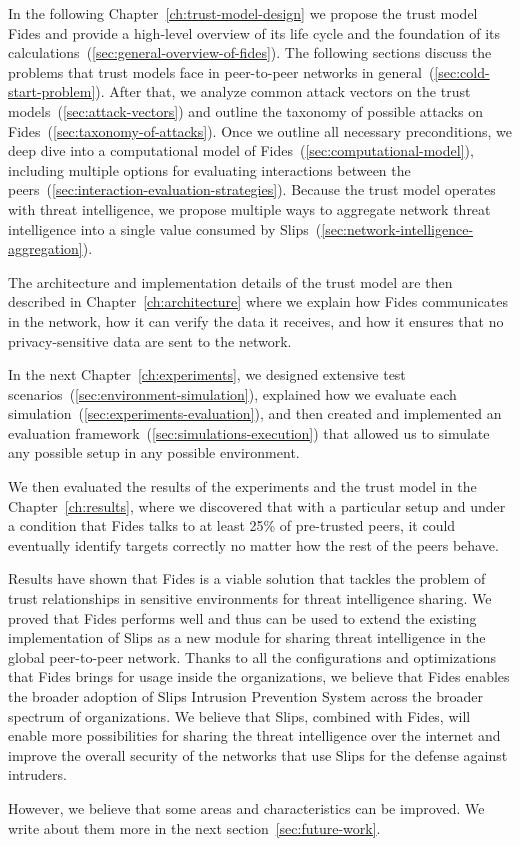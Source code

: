 In the following Chapter~\ref{ch:trust-model-design} we propose the trust model Fides and provide a high-level overview of its life cycle and the foundation of its calculations~(\ref{sec:general-overview-of-fides}).
The following sections discuss the problems that trust models face in peer-to-peer networks in general~(\ref{sec:cold-start-problem}).
After that, we analyze common attack vectors on the trust models~(\ref{sec:attack-vectors}) and outline the taxonomy of possible attacks on Fides~(\ref{sec:taxonomy-of-attacks}).
Once we outline all necessary preconditions, we deep dive into a computational model of Fides~(\ref{sec:computational-model}), including multiple options for evaluating interactions between the peers~(\ref{sec:interaction-evaluation-strategies}).
Because the trust model operates with threat intelligence, we propose multiple ways to aggregate network threat intelligence into a single value consumed by Slips~(\ref{sec:network-intelligence-aggregation}).

The architecture and implementation details of the trust model are then described in Chapter~\ref{ch:architecture} where we explain how Fides communicates in the network, how it can verify the data it receives, and how it ensures that no privacy-sensitive data are sent to the network.

In the next Chapter~\ref{ch:experiments}, we designed extensive test scenarios~(\ref{sec:environment-simulation}), explained how we evaluate each simulation~(\ref{sec:experiments-evaluation}), and then created and implemented an evaluation framework~(\ref{sec:simulations-execution}) that allowed us to simulate any possible setup in any possible environment.

We then evaluated the results of the experiments and the trust model in the Chapter~\ref{ch:results}, where we discovered that with a particular setup and under a condition that Fides talks to at least 25\% of pre-trusted peers, it could eventually identify targets correctly no matter how the rest of the peers behave.

Results have shown that Fides is a viable solution that tackles the problem of trust relationships in sensitive environments for threat intelligence sharing. 
We proved that Fides performs well and thus can be used to extend the existing implementation of Slips as a new module for sharing threat intelligence in the global peer-to-peer network.
Thanks to all the configurations and optimizations that Fides brings for usage inside the organizations, we believe that Fides enables the broader adoption of Slips Intrusion Prevention System across the broader spectrum of organizations.
We believe that Slips, combined with Fides, will enable more possibilities for sharing the threat intelligence over the internet and improve the overall security of the networks that use Slips for the defense against intruders.

However, we believe that some areas and characteristics can be improved. We write about them more in the next section~\ref{sec:future-work}.

